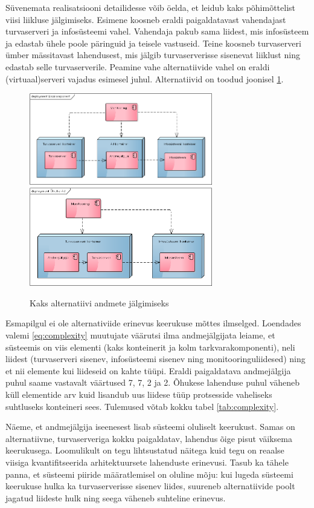 \documentclass{tufte-book}
\begin{document}
Süvenemata realisatsiooni detailidesse võib öelda, et leidub kaks põhimõttelist viisi liikluse jälgimiseks. Esimene koosneb eraldi paigaldatavast vahendajast turvaserveri ja infosüsteemi vahel. Vahendaja pakub sama liidest, mis infosüsteem ja edastab ühele poole päringuid ja teisele vastuseid. Teine koosneb turvaserveri ümber mässitavast lahendusest, mis jälgib turvaserverisse sisenevat liiklust ning edastab selle turvaserverile. Peamine vahe alternatiivide vahel on eraldi (virtuaal)serveri vajadus esimesel juhul. Alternatiivid on toodud joonisel \ref{fig:complexity:added}.


\begin{figure}[ht]
		\includegraphics[width=8cm]{lisakomponent.png}
		\includegraphics[width=8cm]{ohuke.png}
		\caption{Kaks alternatiivi andmete jälgimiseks}
		\label{fig:complexity:added}
\end{figure}

Esmapilgul ei ole alternativiide erinevus keerukuse mõttes ilmselged. Loendades valemi \ref{eq:complexity} muutujate väärutsi ilma andmejälgijata leiame, et süsteemis on viis elementi (kaks konteinerit ja kolm tarkvarakomponenti), neli liidest (turvaserveri sisenev, infosüsteemi sisenev ning monitooringuliidesed) ning et nii elemente kui liideseid on kahte tüüpi. Eraldi paigaldatava andmejälgija puhul saame vastavalt väärtused 7, 7, 2 ja 2. Õhukese lahenduse puhul väheneb küll elementide arv kuid lisandub uus liidese tüüp protsesside vaheliseks suhtluseks konteineri sees. Tulemused võtab kokku tabel \ref{tab:complexity}. 

Näeme, et andmejälgija iseenesest lisab süsteemi oluliselt keerukust. Samas on alternatiivne, turvaserveriga kokku paigaldatav, lahendus õige pisut väiksema keerukusega. Loomulikult on tegu lihtsustatud näitega kuid tegu on reaalse viisiga kvantifitseerida arhitektuursete lahenduste erinevusi. Tasub ka tähele panna, et süsteemi piiride määratlemisel on oluline mõju: kui lugeda süsteemi keerukuse hulka ka turvaserverisse sisenev liides, suureneb alternatiivide poolt jagatud liideste hulk ning seega väheneb suhteline erinevus. 
\end{document}
